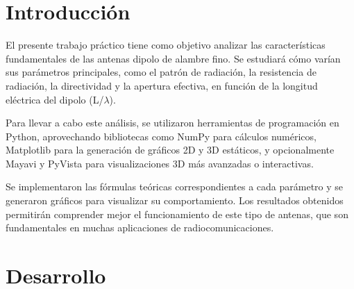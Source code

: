 

\lstset{style=mystyle} %


\section{Introducción}
El presente trabajo práctico tiene como objetivo analizar las características fundamentales de las antenas dipolo de alambre fino. Se estudiará cómo varían sus parámetros principales, como el patrón de radiación, la resistencia de radiación, la directividad y la apertura efectiva, en función de la longitud eléctrica del dipolo (L/$\lambda$).

Para llevar a cabo este análisis, se utilizaron herramientas de programación en Python, aprovechando bibliotecas como NumPy para cálculos numéricos, Matplotlib para la generación de gráficos 2D y 3D estáticos, y opcionalmente Mayavi y PyVista para visualizaciones 3D más avanzadas o interactivas.

Se implementaron las fórmulas teóricas correspondientes a cada parámetro y se generaron gráficos para visualizar su comportamiento. Los resultados obtenidos permitirán comprender mejor el funcionamiento de este tipo de antenas, que son fundamentales en muchas aplicaciones de radiocomunicaciones.
\section*{Desarrollo}
